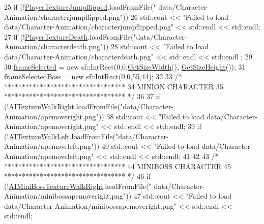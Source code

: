 \begin{DoxyCode}
25     \textcolor{keywordflow}{if} (!\hyperlink{classAnimation_adecc1934d4a148f0cfa36e01c2b2de62}{PlayerTextureJumpflipped}.loadFromFile(\textcolor{stringliteral}{"
      data/Character-Animation/characterjumpflipped.png"}))
26         std::cout << \textcolor{stringliteral}{"Failed to load data/Character-Animation/characterjumpflipped.png"} << std::endl << 
      std::endl;
27     \textcolor{keywordflow}{if} (!\hyperlink{classAnimation_ae2c4250f642ea945b2370857712d120b}{PlayerTextureDeath}.loadFromFile(\textcolor{stringliteral}{"data/Character-Animation/characterdeath.png"}))
28         std::cout << \textcolor{stringliteral}{"Failed to load data/Character-Animation/characterdeath.png"} << std::endl << std::endl
      ;
29 
30     \hyperlink{classAnimation_ad46a2f93624e4c2ed6df5852d1e43306}{frameSelected} = \textcolor{keyword}{new} sf::IntRect(0,0,\hyperlink{classAnimation_a17d7d2d6b964bd376eecd11526ec713e}{GetSizeWidth}(),
      \hyperlink{classAnimation_a7c267306f82cc1ea24efb7eeb837a7c7}{GetSizeHeight}());
31     \hyperlink{classAnimation_a642ba989c928d568640537c2c4233047}{frameSelectedBoss} = \textcolor{keyword}{new} sf::IntRect(0,0,55,44);
32 
33     \textcolor{comment}{/* **********************************}
34 \textcolor{comment}{           MINION CHARACTER}
35 \textcolor{comment}{    ********************************** */}
36 
37     \textcolor{keywordflow}{if} (!\hyperlink{classAnimation_a30495fb9193f8f7cefc524200d35c44e}{AITextureWalkRight}.loadFromFile(\textcolor{stringliteral}{"data/Character-Animation/apemoveright.png"}))
38         std::cout << \textcolor{stringliteral}{"Failed to load data/Character-Animation/apemoveright.png"} << std::endl << std::endl;
39     \textcolor{keywordflow}{if} (!\hyperlink{classAnimation_a7c82d99498237bc172f933f4663810c5}{AITextureWalkLeft}.loadFromFile(\textcolor{stringliteral}{"data/Character-Animation/apemoveleft.png"}))
40         std::cout << \textcolor{stringliteral}{"Failed to load data/Character-Animation/apemoveleft.png"} << std::endl << std::endl;
41 
42 
43     \textcolor{comment}{/* **********************************}
44 \textcolor{comment}{        MINIBOSS CHARACTER}
45 \textcolor{comment}{    ********************************** */}
46     \textcolor{keywordflow}{if} (!\hyperlink{classAnimation_aee6ee164fad1b55ab6d36f447ef20275}{AIMiniBossTextureWalkRight}.loadFromFile(\textcolor{stringliteral}{"
      data/Character-Animation/minibossapemoveright.png"}))
47         std::cout << \textcolor{stringliteral}{"Failed to load data/Character-Animation/minibossapemoveright.png"} << std::endl << 
      std::endl;

\end{DoxyCode}
